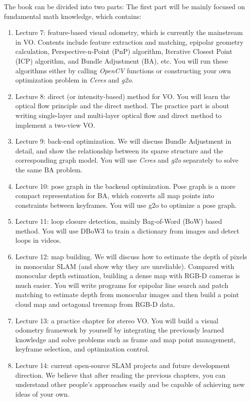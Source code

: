 The book can be divided into two parts: The first part will be mainly focused on fundamental math knowledge, which contains:
\begin{enumerate}
	
	From lecture 7, we will be discussing SLAM algorithms, starting with visual odometry (VO) and followed by the map building problems: 
	
	\item Lecture 7: feature-based visual odometry, which is currently the mainstream in VO. Contents include feature extraction and matching, epipolar geometry calculation, Perspective-n-Point (PnP) algorithm, Iterative Closest Point (ICP) algorithm, and Bundle Adjustment (BA), etc. You will run these algorithms either by calling \textit{OpenCV} functions or constructing your own optimization problem in \textit{Ceres} and \textit{g2o}.
	
	\item Lecture 8: direct (or intensity-based) method for VO. You will learn the optical flow principle and the direct method. The practice part is about writing single-layer and multi-layer optical flow and direct method to implement a two-view VO.
	
	\item Lecture 9: back-end optimization. We will discuss Bundle Adjustment in detail, and show the relationship between its sparse structure and the corresponding graph model. You will use \textit{Ceres} and \textit{g2o} separately to solve the same BA problem.
	
	\item Lecture 10: pose graph in the backend optimization. Pose graph is a more compact representation for BA, which converts all map points into constraints between keyframes. You will use g2o to optimize a pose graph.
	
	\item Lecture 11: loop closure detection, mainly Bag-of-Word (BoW) based method. You will use DBoW3 to train a dictionary from images and detect loops in videos. 
	
	\item Lecture 12: map building. We will discuss how to estimate the depth of pixels in monocular SLAM  (and show why they are unreliable). Compared with monocular depth estimation, building a dense map with RGB-D cameras is much easier. You will write programs for epipolar line search and patch matching to estimate depth from monocular images and then build a point cloud map and octagonal treemap from RGB-D data.
	
	\item Lecture 13: a practice chapter for stereo VO. You will build a visual odometry framework by yourself by integrating the previously learned knowledge and solve problems such as frame and map point management, keyframe selection, and optimization control.
	
	\item Lecture 14: current open-source SLAM projects and future development direction. We believe that after reading the previous chapters, you can understand other people's approaches easily and be capable of achieving new ideas of your own.
\end{enumerate}

